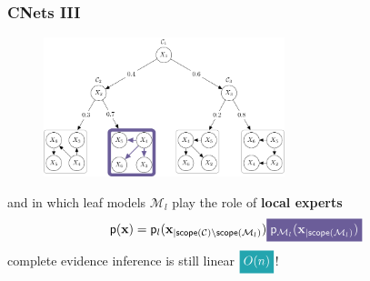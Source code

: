 \documentclass[xcolor={usenames,dvipsnames,svgnames}, compress]{beamer}
\newcommand{\highlight}[2][yellow]{\mathchoice%
  {\colorbox{#1}{\strut\textcolor{white}{$\displaystyle{#2}$}}}%
  {\colorbox{#1}{\strut\textcolor{white}{$\textstyle{#2}$}}}%
  {\colorbox{#1}{\strut\textcolor{white}{$\scriptstyle{#2}$}}}%
  {\colorbox{#1}{\strut\textcolor{white}{$\scriptscriptstyle{#2}$}}}}%
\begin{document}
\begin{frame}[t]
  \frametitle{CNets III}
  \small
  \begin{figure}
     \centering
     \includegraphics[width=7cm]{figures/csn-III}
  \label{fig:csn}
\end{figure}
  and in which leaf models $\mathcal{M}_{l}$ play the role of \textbf{local
  experts}\vspace{-10pt}
  \begin{equation*}
\mathsf{p}(\mathbf{x}) = \mathsf{p}_l(\mathbf
x_{|\mathsf{scope}(\mathcal C)\setminus \mathsf{scope}(\mathcal
  M_l)})\highlight[lacamlilac]{\mathsf{p}_{\mathcal M_l}(\mathbf x_{| \mathsf{scope}(\mathcal
  M_l)})}\label{eq:cnetdistr}
\end{equation*}\vspace{-20pt}
complete evidence inference is still linear $\highlight[petroil2]{O(n)}$!

    
\end{frame}
\end{document}
